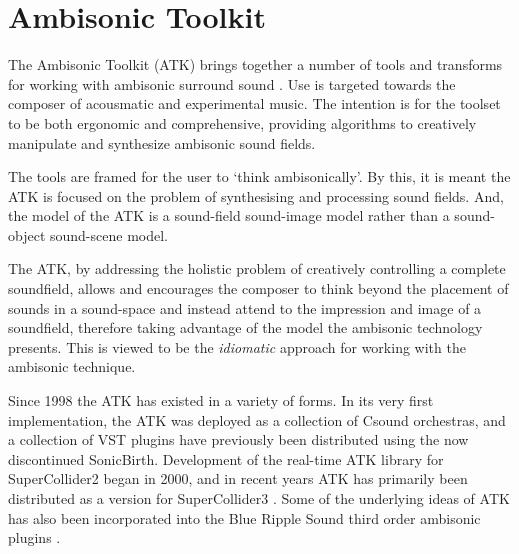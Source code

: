 \documentclass{article}
\begin{document}
\section{Ambisonic Toolkit}\label{sec:atk}

The Ambisonic Toolkit (ATK) brings together a number of tools and transforms for working with ambisonic surround sound  \cite{Anderson:2009introducingATK, anderson:ambisonic_2011}.
Use is targeted towards the composer of acousmatic and experimental music. The intention is for the toolset to be both ergonomic and comprehensive, providing algorithms to creatively manipulate and synthesize ambisonic sound fields.

The tools are framed for the user to `think ambisonically'. By this, it is meant the ATK is focused on the problem of synthesising and processing sound fields. And, the model of the ATK is a sound-field sound-image model rather than a sound-object sound-scene model. 




The ATK, by addressing the holistic problem of creatively controlling a complete soundfield, allows and encourages the composer to think beyond the placement of sounds in a sound-space and instead attend to the impression and image of a soundfield, therefore taking advantage of the model the ambisonic technology presents.
This is viewed to be the {\em idiomatic} approach for working with the ambisonic technique.



Since 1998 the ATK has existed in a variety of forms.
In its very first implementation, the ATK was deployed as a collection of Csound orchestras, and a collection of VST plugins have previously been distributed using the now discontinued SonicBirth.
Development of the real-time ATK library for SuperCollider2 began in 2000, and in recent years ATK has primarily been distributed as a version for SuperCollider3 \cite{Anderson:2009introducingATK}.
Some of the underlying ideas of ATK has also been incorporated into the Blue Ripple Sound third order ambisonic plugins \cite{blueripple:2014TOA}.
\end{document}
